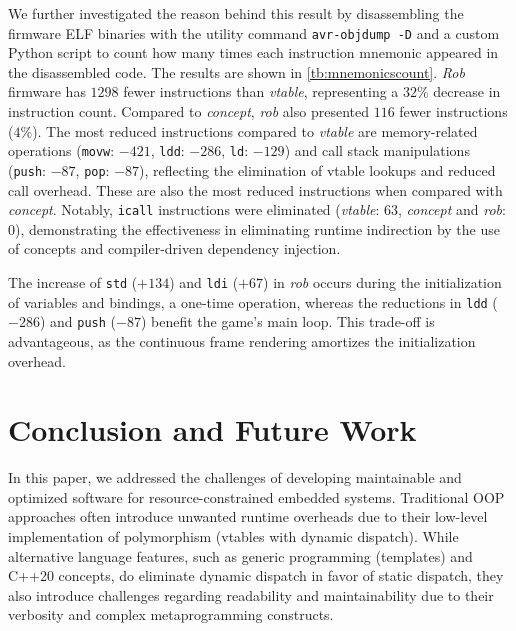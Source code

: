 \documentclass[10pt,sigplan,screen,anonymous]{acmart}
\begin{document}
We further investigated the reason behind this result by disassembling the firmware ELF binaries with the utility command {\tt avr-objdump -D} and a custom Python script to count how many times each instruction mnemonic appeared in the disassembled code. The results are shown in \autoref{tb:mnemonicscount}. \emph{Rob} firmware has $1298$ fewer instructions than \emph{vtable}, representing a $32\%$ decrease in instruction count. Compared to \emph{concept}, \emph{rob} also presented $116$ fewer instructions ($4\%$). The most reduced instructions compared to \emph{vtable} are memory-related operations ({\tt movw}: $-421$, {\tt ldd}: $-286$, {\tt ld}: $-129$) and call stack manipulations ({\tt push}: $-87$, {\tt pop}: $-87$), reflecting the elimination of vtable lookups and reduced call overhead. These are also the most reduced instructions when compared with \emph{concept}. Notably, {\tt icall} instructions were eliminated (\emph{vtable}: $63$, \emph{concept} and \emph{rob}: 0), demonstrating the effectiveness in eliminating runtime indirection by the use of concepts and compiler-driven dependency injection. 

The increase of \texttt{std} ($+134$) and \texttt{ldi} ($+67$) in \textit{rob} occurs during the initialization of variables and bindings, a one-time operation, whereas the reductions in \texttt{ldd} ($-286$) and \texttt{push} ($-87$) benefit the game's main loop. This trade-off is advantageous, as the continuous frame rendering amortizes the initialization overhead.





\section{Conclusion and Future Work} \label{sec:conclusion}

In this paper, we addressed the challenges of developing maintainable and optimized software for resource-constrained embedded systems. Traditional OOP approaches often introduce unwanted runtime overheads due to their low-level implementation of polymorphism (vtables with dynamic dispatch). While alternative language features, such as generic programming (templates) and C++20 concepts, do eliminate dynamic dispatch in favor of static dispatch, they also introduce challenges regarding readability and maintainability due to their verbosity and complex metaprogramming constructs. 
\end{document}
